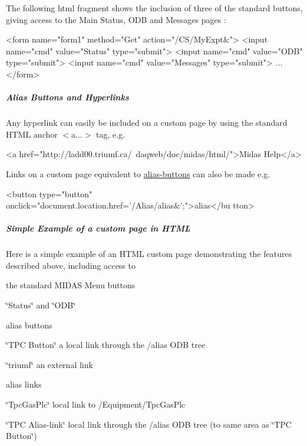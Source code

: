 The following html fragment shows the inclusion of three of the standard buttons, giving access to the Main Status, ODB and Messages pages : 
\begin{DoxyCode}
<form name="form1" method="Get" action="/CS/MyExpt&">
<input name="cmd" value="Status" type="submit">
<input name="cmd" value="ODB" type="submit">
<input name="cmd" value="Messages" type="submit">
...
</form>
\end{DoxyCode}




\hypertarget{RC_mhttpd_custom_features_RC_mhttpd_custom_alias}{}\subparagraph{Alias Buttons and Hyperlinks}\label{RC_mhttpd_custom_features_RC_mhttpd_custom_alias}
Any hyperlink can easily be included on a custom page by using the standard HTML anchor $<$a...$>$ tag, e.g. 
\begin{DoxyCode}
<a href="http://ladd00.triumf.ca/~daqweb/doc/midas/html/">Midas Help</a>
\end{DoxyCode}


Links on a custom page equivalent to \hyperlink{RC_mhttpd_status_page_features_RC_mhttpd_status_Alias_buttons}{alias-\/buttons} can also be made e.g.


\begin{DoxyCode}
<button type="button" onclick="document.location.href='/Alias/alias&';">alias</bu
      tton>
\end{DoxyCode}
\hypertarget{RC_mhttpd_custom_features_RC_mhttpd_custom_simple_example}{}\subparagraph{Simple Example of a custom page in HTML}\label{RC_mhttpd_custom_features_RC_mhttpd_custom_simple_example}
Here is a simple example of an HTML custom page demonstrating the features described above, including access to
\begin{DoxyItemize}
\item the standard MIDAS Menu buttons
\begin{DoxyItemize}
\item \char`\"{}Status\char`\"{} and \char`\"{}ODB\char`\"{}
\end{DoxyItemize}
\item alias buttons
\begin{DoxyItemize}
\item \char`\"{}TPC Button\char`\"{} a local link through the /alias ODB tree
\item \char`\"{}triumf\char`\"{} an external link
\end{DoxyItemize}
\item alias links
\begin{DoxyItemize}
\item \char`\"{}TpcGasPlc\char`\"{} local link to /Equipment/TpcGasPlc
\item \char`\"{}TPC Alias-\/link\char`\"{} local link through the /alias ODB tree (to same area as \char`\"{}TPC Button\char`\"{})
\end{DoxyItemize}
\end{DoxyItemize}

